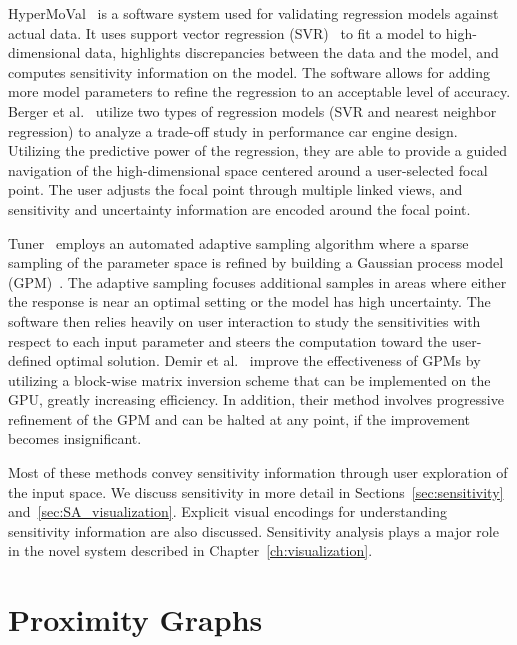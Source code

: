 HyperMoVal~\cite{PiringerBergerKrasser2010} is a software system used for validating regression models against actual data.
%
It uses support vector regression (SVR)~\cite{SmolaScholkopf2004} to fit a model to high-dimensional data, highlights discrepancies between the data and the model, and computes sensitivity information on the model.
%
The software allows for adding more model parameters to refine the regression to an acceptable level of accuracy.
%
Berger et al.~\cite{BergerPiringerFilzmoser2011} utilize two types of regression models (SVR and nearest neighbor regression) to analyze a trade-off study in performance car engine design.
%
Utilizing the predictive power of the regression, they are able to provide a guided navigation of the high-dimensional space centered around a user-selected focal point.
%
The user adjusts the focal point through multiple linked views, and sensitivity and uncertainty information are encoded around the focal point.

Tuner~\cite{Torsney-WeirSaadMoller2011} employs an automated adaptive sampling algorithm where a sparse sampling of the parameter space is refined by building a Gaussian process model (GPM)~\cite{RasmussenWilliams2006}.
%
The adaptive sampling focuses additional samples in areas where either the response is near an optimal setting or the model has high uncertainty.
%
The software then relies heavily on user interaction to study the sensitivities with respect to each input parameter and steers the computation toward the user-defined optimal solution.
%
Demir et al.~\cite{DemirWestermann2013} improve the effectiveness of GPMs by utilizing a block-wise matrix inversion scheme that can be implemented on the GPU, greatly increasing efficiency.
%
In addition, their method involves progressive refinement of the GPM and can be halted at any point, if the improvement becomes insignificant.

Most of these methods convey sensitivity information through user exploration of the input space.
%
We discuss sensitivity in more detail in Sections~\ref{sec:sensitivity} and~\ref{sec:SA_visualization}.
%
Explicit visual encodings for understanding sensitivity information are also discussed.
%
Sensitivity analysis plays a major role in the novel system described in Chapter~\ref{ch:visualization}.

\section{Proximity Graphs}
\label{sec:graphs}

